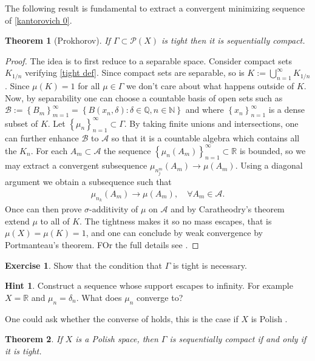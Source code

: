 \documentclass[
    a4paper,
    DIV=14,
    abstract=true,
    numbers=noenddot
]
{scrartcl}
\newtheorem{theorem}{Theorem}[section]
\theoremstyle{definition}
\newtheorem{exercise}{Exercise}
\newtheorem*{hint}{Hint}
\newcommand{\set}[1]{\left\{#1\right\}}
\newcommand{\N}{\mathbb{N}}
\newcommand{\Q}{\mathbb{Q}}
\newcommand{\R}{\mathbb{R}}
\newcommand{\Aa}{\mathcal{A}}
\newcommand{\Bb}{\mathcal{B}}
\newcommand{\Pp}{\mathcal{P}}
\begin{document}
The following result is fundamental to extract a convergent minimizing sequence of \eqref{kantorovich 0}.
\begin{theorem}[Prokhorov] If $\Gamma \subset \Pp (X)$ is tight then it is sequentially compact.\label{prokhorov}
\end{theorem}
\begin{proof}
    The idea is to first reduce to a separable space. Consider compact sets $K_{1/n}$ verifying \ref{tight def}. Since compact sets are separable, so is $K:=\bigcup_{n=1}^\infty K_{1/n}$. Since $\mu (K)= 1$ for all $\mu \in \Gamma $ we don't care about what happens outside of $K$. Now, by separability one can choose a countable basis of open sets such as $ \Bb :=\set{B_m}_{m=1}^\infty=\set{B(x_n, \delta ): \delta \in \Q, n \in \N}$ and where $\set{x_n}_{n=1}^\infty$ is a dense subset of $K$. Let $\set{\mu_n}_{n=1}^\infty \subset \Gamma $. By taking finite unions and intersections, one can further enhance $\Bb $  to $\Aa $ so that it is a countable algebra which contains all the $K_n$. For each $A_m \subset \Aa  $ the sequence $\set{\mu _n(A_m)}_{n=1}^\infty \subset \R$ is bounded, so we may extract a convergent subsequence $\mu_{n_j^m}(A_m) \to \mu (A_m)$. Using a diagonal argument we obtain a subsequence such that
    \begin{align*}
        \mu_{n_k}(A_m) \to \mu (A_m), \quad\forall A_m \in \Aa.
    \end{align*}
    Once can then prove $\sigma $-additivity of  $\mu $ on $\Aa $ and by Caratheodry's theorem extend $\mu $ to all of $K$. The tightness makes it so no mass escapes, that is $\mu(X)=\mu(K)=1$, and one can conclude by weak convergence by Portmanteau's theorem. FOr the full details see \cite[Theorem 5.1, p.59]{billingsley2013convergence}.
\end{proof}
\begin{exercise}
    Show that the condition that $\Gamma $ is tight is necessary.
\end{exercise}
\begin{hint}
    Construct a sequence whose support escapes to infinity. For example $X=\R$ and $\mu_n = \delta_n$. What does $\mu_n$ converge to?
\end{hint}




One could ask whether the converse of  holds, this is the case if $X$ is Polish \cite[Theorem 5.2, p.60]{billingsley2013convergence}.
\begin{theorem}
    If $X$ is a Polish space, then $\Gamma $ is sequentially compact if and only if it is tight.
\end{theorem}
\end{document}
